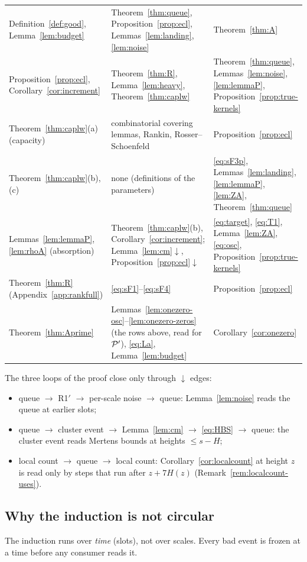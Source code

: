 \begin{center}
\begin{tabular}{@{}p{4.4cm}p{6.6cm}p{3.5cm}@{}}
Definition~\ref{def:good}, Lemma~\ref{lem:budget} & Theorem~\ref{thm:queue}, Proposition~\ref{prop:ecl}, Lemmas~\ref{lem:landing}, \ref{lem:noise} & Theorem~\ref{thm:A} \\
Proposition~\ref{prop:ecl}, Corollary~\ref{cor:increment} & Theorem~\ref{thm:R}, Lemma~\ref{lem:heavy}, Theorem~\ref{thm:caplw} & Theorem~\ref{thm:queue}, Lemmas~\ref{lem:noise}, \ref{lem:lemmaP}, Proposition~\ref{prop:true-kernels} \\
Theorem~\ref{thm:caplw}(a) (capacity) & combinatorial covering lemmas, Rankin, Rosser--Schoenfeld & Proposition~\ref{prop:ecl} \\
Theorem~\ref{thm:caplw}(b),(c) & none (definitions of the parameters) & \ref{eq:sF3p}, Lemmas~\ref{lem:landing}, \ref{lem:lemmaP}, \ref{lem:ZA}, Theorem~\ref{thm:queue} \\
Lemmas~\ref{lem:lemmaP}, \ref{lem:rhoA} (absorption) & Theorem~\ref{thm:caplw}(b), Corollary~\ref{cor:increment}; Lemma~\ref{lem:cm}$\downarrow$, Proposition~\ref{prop:ecl}$\downarrow$ & \eqref{eq:target}, \eqref{eq:T1}, Lemma~\ref{lem:ZA}, \eqref{eq:osc}, Proposition~\ref{prop:true-kernels} \\
Theorem~\ref{thm:R} (Appendix~\ref{app:rankfull}) & \ref{eq:sF1}--\ref{eq:sF4} & Proposition~\ref{prop:ecl} \\
Theorem~\ref{thm:Aprime} & Lemmas~\ref{lem:onezero-osc}--\ref{lem:onezero-zeros} (the rows above, read for $\mathcal{P}'$), \eqref{eq:La}, Lemma~\ref{lem:budget} & Corollary~\ref{cor:onezero} \\ \hline
\end{tabular}
\end{center}
The three loops of the proof close only through $\downarrow$ edges:
\begin{itemize}
\item queue $\to$ R1$'$ $\to$ per-scale noise $\to$ queue: Lemma~\ref{lem:noise} reads the queue at earlier slots;
\item queue $\to$ cluster event $\to$ Lemma~\ref{lem:cm} $\to$ \eqref{eq:HBS} $\to$ queue: the cluster event reads Mertens bounds at
heights $\le s-H$;
\item local count $\to$ queue $\to$ local count: Corollary~\ref{cor:localcount} at height $z$ is read only by steps that run after
$z+7H(z)$ (Remark~\ref{rem:localcount-uses}).
\end{itemize}

\subsection{Why the induction is not circular}\label{sec:noncirc}
The induction runs over \emph{time} (slots), not over scales. Every bad event is frozen at a time before any consumer reads it.

